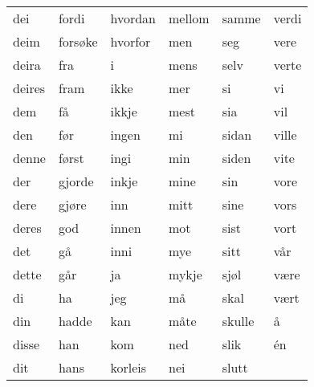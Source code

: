 \begin{table}[htbp]
\begin{tabular}{l l l l l l}
    dei & fordi & hvordan & mellom & samme & verdi \\
    deim & forsøke & hvorfor & men & seg & vere \\
    deira & fra & i & mens & selv & verte \\
    deires & fram & ikke & mer & si & vi \\
    dem & få & ikkje & mest & sia & vil \\
    den & før & ingen & mi & sidan & ville \\
    denne & først & ingi & min & siden & vite \\
    der & gjorde & inkje & mine & sin & vore \\
    dere & gjøre & inn & mitt & sine & vors \\
    deres & god & innen & mot & sist & vort \\
    det & gå & inni & mye & sitt & vår \\
    dette & går & ja & mykje & sjøl & være \\
    di & ha & jeg & må & skal & vært \\
    din & hadde & kan & måte & skulle & å \\
    disse & han & kom & ned & slik & én \\
    dit & hans & korleis & nei & slutt &  \\
    \bottomrule
\end{tabular}
\end{table}


